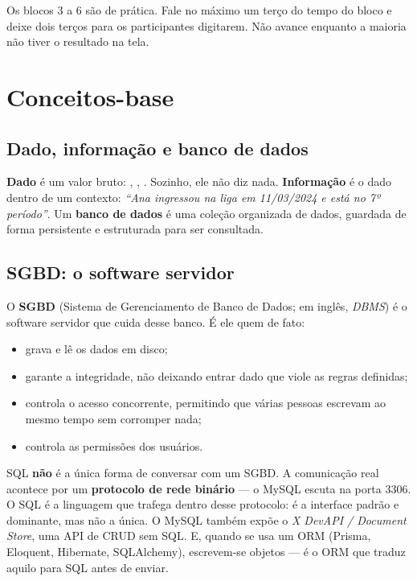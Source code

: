 \begin{dica}
Os blocos 3 a 6 são de prática. Fale no máximo um terço do tempo do bloco e
deixe dois terços para os participantes digitarem. Não avance enquanto a
maioria não tiver o resultado na tela.
\end{dica}

\section{Conceitos-base}
\label{sec:conceitos}

\subsection{Dado, informação e banco de dados}

\textbf{Dado} é um valor bruto: , ,
. Sozinho, ele não diz nada. \textbf{Informação} é o dado dentro de
um contexto: \emph{``Ana ingressou na liga em 11/03/2024 e está no 7º
período''}. Um \textbf{banco de dados} é uma coleção organizada de dados,
guardada de forma persistente e estruturada para ser consultada.

\subsection{SGBD: o software servidor}

O \textbf{SGBD} (Sistema de Gerenciamento de Banco de Dados; em inglês,
\emph{DBMS}) é o software servidor que cuida desse banco. É ele quem de fato:

\begin{itemize}
    \item grava e lê os dados em disco;
    \item garante a integridade, não deixando entrar dado que viole as regras definidas;
    \item controla o acesso concorrente, permitindo que várias pessoas escrevam
          ao mesmo tempo sem corromper nada;
    \item controla as permissões dos usuários.
\end{itemize}

\begin{aviso}
SQL \textbf{não} é a única forma de conversar com um SGBD. A comunicação real
acontece por um \textbf{protocolo de rede binário} --- o MySQL escuta na porta
3306. O SQL é a linguagem que trafega dentro desse protocolo: é a interface
padrão e dominante, mas não a única. O MySQL também expõe o \emph{X DevAPI /
Document Store}, uma API de CRUD sem SQL. E, quando se usa um ORM (Prisma,
Eloquent, Hibernate, SQLAlchemy), escrevem-se objetos --- é o ORM que traduz
aquilo para SQL antes de enviar.
\end{aviso}

